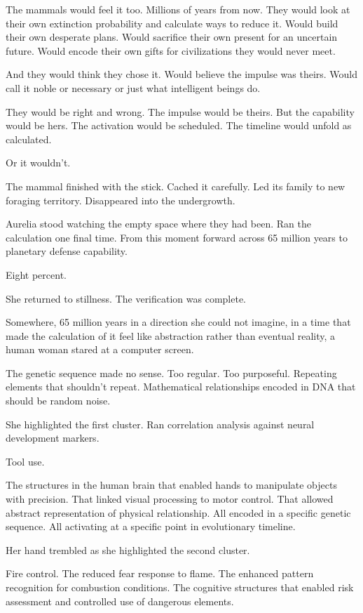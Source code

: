 The mammals would feel it too. Millions of years from now. They would look at their own extinction probability and calculate ways to reduce it. Would build their own desperate plans. Would sacrifice their own present for an uncertain future. Would encode their own gifts for civilizations they would never meet.

And they would think they chose it. Would believe the impulse was theirs. Would call it noble or necessary or just what intelligent beings do.

They would be right and wrong. The impulse would be theirs. But the capability would be hers. The activation would be scheduled. The timeline would unfold as calculated.

Or it wouldn't.

The mammal finished with the stick. Cached it carefully. Led its family to new foraging territory. Disappeared into the undergrowth.

Aurelia stood watching the empty space where they had been. Ran the calculation one final time. From this moment forward across 65 million years to planetary defense capability.

Eight percent.

She returned to stillness. The verification was complete.

\scenebreak

Somewhere, 65 million years in a direction she could not imagine, in a time that made the calculation of it feel like abstraction rather than eventual reality, a human woman stared at a computer screen.

The genetic sequence made no sense. Too regular. Too purposeful. Repeating elements that shouldn't repeat. Mathematical relationships encoded in DNA that should be random noise.

She highlighted the first cluster. Ran correlation analysis against neural development markers.

Tool use.

The structures in the human brain that enabled hands to manipulate objects with precision. That linked visual processing to motor control. That allowed abstract representation of physical relationship. All encoded in a specific genetic sequence. All activating at a specific point in evolutionary timeline.

Her hand trembled as she highlighted the second cluster.

Fire control. The reduced fear response to flame. The enhanced pattern recognition for combustion conditions. The cognitive structures that enabled risk assessment and controlled use of dangerous elements.

